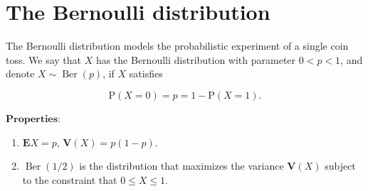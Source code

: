 \section{The Bernoulli distribution}

The Bernoulli distribution models the probabilistic
experiment of a single coin toss. We say that $X$ has
the Bernoulli distribution with parameter $0<p<1$,
and denote $X \sim \operatorname{Ber}(p)$, if $X$
satisfies

\[
\mathrm{P}(X=0)=p = 1-\mathrm{P}(X=1).
\]

\noindent $\textbf{Properties:}$

\begin{enumerate}[label=\arabic*.]
\item $\mathbf{E} X = p$, $\mathbf{V}(X) = p(1-p)$.

\item $\operatorname{Ber}(1/2)$ is the distribution that
maximizes the variance $\mathbf{V}(X)$ subject to the
constraint that $0\le X\le 1$.
\end{enumerate}
